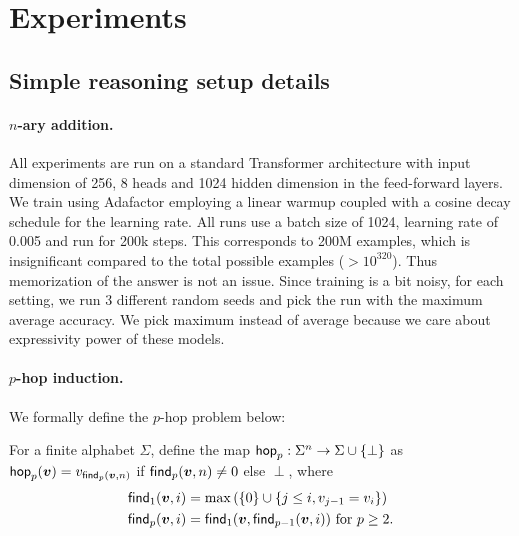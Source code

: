 
\appendix
\section{Experiments}

\subsection{Simple reasoning setup details}


\paragraph{$n$-ary addition.}
\label{sec:apx_addition}

All experiments are run on a standard Transformer architecture with input dimension of 256, 8 heads and 1024 hidden dimension in the feed-forward layers.  We train using Adafactor \citep{shazeer2018adafactor} employing a linear warmup coupled with a cosine decay schedule for the learning rate.
All runs use a batch size of 1024, learning rate of 0.005 and run for 200k steps.
This corresponds to 200M examples, which is insignificant compared to the total possible examples ($> 10^{320}$). Thus memorization of the answer is not an issue. Since training is a bit noisy, for each setting, we run 3 different random seeds and pick the run with the maximum average accuracy. We pick maximum instead of average because we care about expressivity power of these models.


\paragraph{$p$-hop induction.}
\label{sec:apx_khop}

We formally define the $p$-hop problem below:
\begin{definition}\label{defi:khop}
For a finite alphabet $\Sigma$, define the map $\mathsf{hop}_p: \Sigma^n \to \Sigma \cup \{\perp\}$ as $\mathsf{hop}_p({\bm{v}}) = v_{\mathsf{find}_p({\bm{v}}, n)}$ if $\mathsf{find}_p({\bm{v}}, n) \neq 0$ else $\perp$, where
\begin{align*}
    \mathsf{find}_1({\bm{v}}, i) &= \max\left(\{0\} \cup \{j \le i, v_{j-1} = v_i \}\right) \\
    \mathsf{find}_p({\bm{v}}, i) &= \mathsf{find}_1({\bm{v}}, \mathsf{find}_{p-1}({\bm{v}}, i)) \text{ for } p \ge 2.
\end{align*}
\end{definition}


